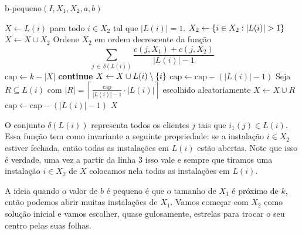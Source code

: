 \begin{algorithm}[H]
    \caption{\sc b-pequeno$(I,X_1,X_2,a,b)$}
    \begin{algorithmic}[1]
        \State $X \gets L(i)$ para todo $i \in X_2$ tal que $|L(i)| = 1$.
        \State $X_2 \gets \{i \in X_2 : |L(i)| > 1\}$
        \State $X \gets X \cup X_2$
        \State Ordene $X_2$ em ordem decrescente da função
                    \[\sum_{ j \, \in \, \delta(L(i))} \frac{ c(j,X_1) + c(j,X_2)} {|L(i)| - 1} \]
        \State $\text{cap} \gets k - |X|$
                \State \textbf{continue}
                \State $X \gets X \cup L(i) \setminus \{i\}$
                \State $\text{cap}\gets \text{cap}  - (|L(i)| - 1)$
            \Else
                \State Seja $R \subseteq L(i)$ com $|R| = \left\lceil \frac{\text{cap}}{|L(i)| - 1} \cdot |L(i)| \right\rceil$ escolhido aleatoriamente
                \State $X \gets X \cup R$
                \State $\text{cap} \gets \text{cap} - (|L(i)| - 1)$
            \EndIf
        \EndFor
        \State \Return $X$
    \end{algorithmic}
\end{algorithm}
O conjunto $\delta(L(i))$ representa todos os clientes $j$ tais que $i_1(j) \in L(i)$. Essa função tem como invariante a seguinte propriedade: se a instalação $i \in X_2$ estiver fechada, então todas as instalações em $L(i)$ estão abertas. Note que isso é verdade, uma vez a partir da linha 3 isso vale e sempre que tiramos uma instalação $i \in X_2$ de $X$ colocamos nela todas as instalações em $L(i)$.

A ideia quando o valor de $b$ é pequeno é que o tamanho de $X_1$ é próximo de $k$, então podemos abrir muitas instalações de $X_1$. 
Vamos começar com $X_2$ como solução inicial e vamos escolher, quase gulosamente, estrelas para trocar o seu centro pelas suas folhas.

